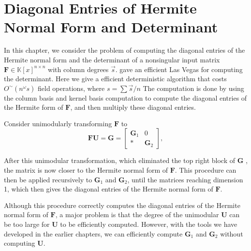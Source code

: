 
\chapter{\label{chap:determinant}Diagonal Entries of Hermite Normal Form
and Determinant}

In this chapter, we consider the problem of computing the diagonal
entries of the Hermite normal form and the determinant of a nonsingular
input matrix $\mathbf{F}\in\mathbb{K}\left[x\right]^{n\times n}$
with column degrees $\vec{s}$. \citet{storjohann:2002,storjohann:2003}
gave an efficient Las Vegas for computing the determinant. Here we
give a efficient deterministic algorithm that costs $O^{\sim}\left(n^{\omega}s\right)$
field operations, where $s=\sum\vec{s}/n$ The computation is done
by using the column basis and kernel basis computation to compute
the diagonal entries of the Hermite form of $\mathbf{F}$, and then
multiply these diagonal entries.

Consider unimodularly transforming $\mathbf{F}$ to 
\begin{equation}
\mathbf{F}\mathbf{U}=\mathbf{G}=\begin{bmatrix}\mathbf{G}_{1} & 0\\
* & \mathbf{G}_{2}
\end{bmatrix},\label{eq:step1HermiteDiagonal}
\end{equation}


 After this unimodular transformation, which eliminated the top
right block of $\mathbf{G}$ , the matrix is now closer to the Hermite
normal form of $\mathbf{F}$. This procedure can then be applied recursively
to $\mathbf{G}_{1}$ and $\mathbf{G}_{2}$, until the matrices reaching
dimension 1, which then gives the diagonal entries of the Hermite
normal form of $\mathbf{F}$.

Although this procedure correctly computes the diagonal entries of
the Hermite normal form of $\mathbf{F}$, a major problem is that
the degree of the unimodular $\mathbf{U}$ can be too large for $\mathbf{U}$
to be efficiently computed. However, with the tools we have developed
in the earlier chapters, we can efficiently compute $\mathbf{G}_{1}$
and $\mathbf{G}_{2}$ without computing $\mathbf{U}$.

